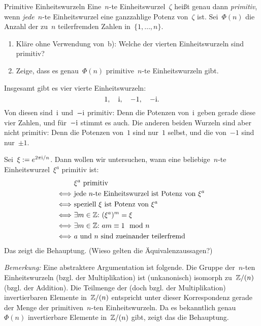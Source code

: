 \documentclass{algblatt}
\begin{document}
\ifloesungen\newpage\fi
\begin{aufgabe}{Primitive Einheitswurzeln}
Eine~$n$-te Einheitswurzel~$\zeta$ heißt genau dann \emph{primitiv}, wenn
\emph{jede}~$n$-te Einheitswurzel eine ganzzahlige Potenz von~$\zeta$ ist.
Sei~$\Phi(n)$ die Anzahl der zu~$n$ teilerfremden Zahlen
in~$\{1,\ldots,n\}$.
\begin{enumerate}
\item Kläre ohne Verwendung von~b): Welche der vierten Einheitswurzeln sind
primitiv?
\item Zeige, dass es genau~$\Phi(n)$ primitive~$n$-te
Einheitswurzeln gibt.
\end{enumerate}
\begin{loesungE}
\item Insgesamt gibt es vier vierte Einheitswurzeln:
\[ 1,\quad \mathrm{i},\quad -1,\quad -\mathrm{i}. \]
Von diesen sind~$\mathrm{i}$ und~$-\mathrm{i}$ primitiv: Denn die Potenzen von~$\mathrm{i}$ geben
gerade diese vier Zahlen, und für~$-\mathrm{i}$ stimmt es auch. Die anderen beiden
Wurzeln sind aber nicht primitiv: Denn die Potenzen von~$1$ sind nur~$1$
selbst, und die von~$-1$ sind nur~$\pm 1$.

\item Sei~$\xi := e^{2\pi\mathrm{i}/n}$. Dann wollen wir untersuchen, wann eine
beliebige~$n$-te Einheitswurzel~$\xi^a$ primitiv ist:
\begin{align*}
  & \text{$\xi^a$ primitiv} \\
  \Longleftrightarrow\ &
    \text{jede $n$-te Einheitswurzel ist Potenz von~$\xi^a$} \\
  \Longleftrightarrow\ &
    \text{speziell~$\xi$ ist Potenz von~$\xi^a$} \\
  \Longleftrightarrow\ &
    \exists m \in \ZZ{:}\ 
    (\xi^a)^m = \xi \\
  \Longleftrightarrow\ &
    \exists m \in \ZZ{:}\ 
    am \equiv 1 \mod n \\
  \Longleftrightarrow\ &
    \text{$a$ und $n$ sind zueinander teilerfremd}
\end{align*}
Das zeigt die Behauptung. (Wieso gelten die Äquivalenzaussagen?)

\emph{Bemerkung:} Eine abstraktere Argumentation ist folgende. Die Gruppe
der~$n$-ten Einheitswurzeln (bzgl. der Multiplikation) ist (unkanonisch)
isomorph zu~$\mathbb{Z}/(n)$ (bzgl. der Addition). Die Teilmenge der (doch bzgl. der
Multiplikation) invertierbaren Elemente in~$\mathbb{Z}/(n)$ entspricht unter dieser
Korrespondenz gerade der Menge der primitiven~$n$-ten Einheitswurzeln. Da es
bekanntlich genau~$\Phi(n)$ invertierbare Elemente in~$\mathbb{Z}/(n)$ gibt, zeigt das
die Behauptung.
\end{loesungE}
\end{aufgabe}
\end{document}
